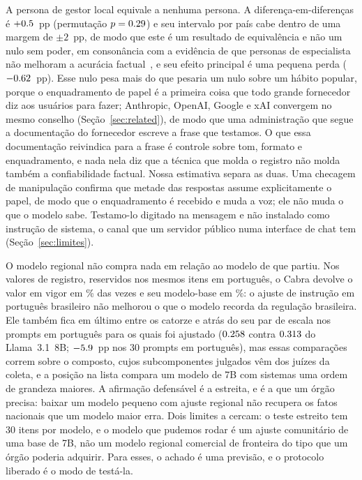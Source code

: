 A persona de gestor local equivale a nenhuma persona. A
diferença-em-diferenças é $+0.5$~pp (permutação $p=0.29$) e seu intervalo
por país cabe dentro de uma margem de $\pm2$~pp, de modo que este é um resultado
de equivalência e não um nulo sem poder, em consonância com a
evidência de que personas de especialista não melhoram a acurácia
factual~\citep{zheng2024helpful,mollick2025personas}, e seu efeito principal é
uma pequena perda ($-0.62$~pp). Esse nulo pesa mais do que pesaria um
nulo sobre um hábito popular, porque o enquadramento de papel é a primeira
coisa que todo grande fornecedor diz aos usuários para fazer; Anthropic, OpenAI,
Google e xAI convergem no mesmo conselho (Seção~\ref{sec:related}), de modo que
uma administração que segue a documentação do fornecedor escreve a frase que
testamos. O que essa documentação reivindica para a frase é controle sobre tom,
formato e enquadramento, e nada nela diz que a técnica que molda o registro não
molda também a confiabilidade factual. Nossa estimativa separa as duas. Uma
checagem de manipulação confirma que metade das respostas assume
explicitamente o papel, de modo que o enquadramento é recebido e muda a voz;
ele não muda o que o modelo sabe. Testamo-lo digitado na mensagem e não
instalado como instrução de sistema, o canal que um servidor público numa
interface de chat tem (Seção~\ref{sec:limites}).

O modelo regional não compra nada em relação ao modelo de que partiu. Nos
valores de registro, reservidos nos mesmos itens em português, o Cabra devolve o
valor em vigor em \ncabsanitycabra\% das vezes e seu modelo-base em
\ncabsanitybase\%: o ajuste de instrução em português brasileiro não melhorou o
que o modelo recorda da regulação brasileira. Ele também fica em último entre os
catorze e atrás do seu par de escala nos prompts em português para os quais foi
ajustado ($0.258$ contra $0.313$ do Llama~3.1~8B;
$-5.9$~pp nos 30 prompts em português), mas essas comparações correm
sobre o composto, cujos subcomponentes julgados vêm dos juízes da coleta, e a
posição na lista compara um modelo de 7B com sistemas uma ordem de grandeza
maiores. A afirmação defensável é a estreita, e é a que um órgão precisa: baixar
um modelo pequeno com ajuste regional não recupera os fatos nacionais que um
modelo maior erra. Dois limites a cercam: o teste estreito tem 30 itens por
modelo, e o modelo que pudemos rodar é um ajuste comunitário de uma base de 7B,
não um modelo regional comercial de fronteira do tipo que um órgão poderia
adquirir. Para esses, o achado é uma previsão, e o protocolo liberado é o modo
de testá-la.

